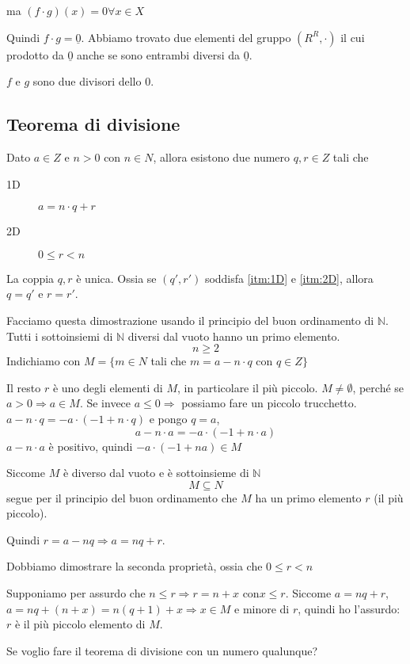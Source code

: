 ma $(f \cdot g) (x) = 0 \forall x \in X$

Quindi $f \cdot g = \underline{0}$. Abbiamo trovato due elementi del gruppo $(R^R, \cdot)$ il cui prodotto da $\underline{0}$ anche se sono entrambi diversi da $\underline{0}$.

$f$ e $g$ sono due divisori dello 0.

\subsection{Teorema di divisione}

Dato $a \in Z$ e $n > 0$ con $n \in N$, allora esistono due numero $q, r \in Z$ tali che
\begin{description}
    \item[1D\label{itm:1D}] $a = n \cdot q + r$
    \item[2D\label{itm:2D}] $0 \le r < n$
\end{description}
La coppia $q, r$ \`e unica. Ossia se $(q', r')$ soddisfa \ref{itm:1D} e \ref{itm:2D}, allora $q = q'$ e $r = r'$.

Facciamo questa dimostrazione usando il principio del buon ordinamento di $\mathbb{N}$. Tutti i sottoinsiemi di $\mathbb{N}$ diversi dal vuoto hanno un primo elemento.
\[
n \ge 2
\]
Indichiamo con $M = \{ m \in N$ tali che $m = a - n \cdot q$ con $q \in Z \}$

Il resto $r$ \`e uno degli elementi di $M$, in particolare il pi\`u piccolo. $M \neq \emptyset$, perch\'e se $a > 0 \Rightarrow a \in M$. Se invece $a \le 0 \Rightarrow$ possiamo fare un piccolo trucchetto. $a - n \cdot q = - a \cdot (-1 + n \cdot q)$ e pongo $q = a$,
\[
a - n \cdot a = - a \cdot (-1 + n \cdot a)
\]
$a - n \cdot a$ \`e positivo, quindi $- a \cdot (-1 + n a) \in M$

Siccome $M$ \`e diverso dal vuoto e \`e sottoinsieme di $\mathbb{N}$
\[
M \subseteq N
\]
segue per il principio del buon ordinamento che $M$ ha un primo elemento $r$ (il pi\`u piccolo).

Quindi $r = a - n q \Rightarrow a = n q + r$.

Dobbiamo dimostrare la seconda propriet\`a, ossia che $0 \le r < n$

Supponiamo per assurdo che $n \le r \Rightarrow r = n + x$ con$ x \le r$. Siccome $a = n q + r$, $a = n q + (n + x) = n (q + 1) + x \Rightarrow x \in M$ e minore di $r$, quindi ho l'assurdo: $r$ \`e il pi\`u piccolo elemento di $M$.

Se voglio fare il teorema di divisione con un numero qualunque?

